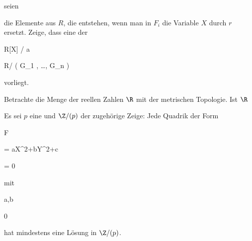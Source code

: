 {{{   }{
}


}
{}{}{}
seien


 die Elemente aus $R$, die entstehen, wenn man in $F_i$ die Variable $X$ durch $r$ ersetzt. Zeige, dass eine
der


\mavergleichskettedisp


{\vergleichskette


{ R[X] / {\mathfrak a}
}


{ \cong} { R/ \left(  G_1 , \ldots , G_n  \right)
}


{ } {
}


{ } {
}


{ } {
}


}
{}{}{}
vorliegt.


}


{} {}




{}


{


Betrachte die Menge der reellen Zahlen $\R$ mit der metrischen Topologie. Ist $\R$


}


{} {}




{}


{


Es sei $p$ eine
und $\Z/( p )$ der zugehörige
Zeige: Jede Quadrik der Form


\mavergleichskettedisp


{\vergleichskette


{ F
}


{ =} { aX^2+bY^2+c
}


{ =} { 0
}


{ } {
}


{ } {
}


}
{}{}{}
mit


\mavergleichskette


{\vergleichskette


{ a,b
}


{ \neq }{ 0
}


{  }{
}


{    }{
}


{   }{
}


}
{}{}{}
hat mindestens eine Lösung in $\Z/( p )$.


}


